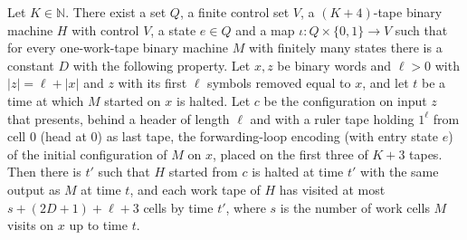 \begin{theorem}
\label{Complexity.f6_loop}
\leanok
{}
Let $K\in\mathbb{N}$. There exist a set $Q$, a finite control set $V$, a $(K+4)$-tape binary machine
$H$ with control $V$, a state $e\in Q$ and a map $\iota:Q\times\{0,1\}\to V$ such that for every
one-work-tape binary machine $M$ with finitely many states there is a constant $D$ with the
following property. Let $x,z$ be binary words and $\ell>0$ with $|z|=\ell+|x|$ and $z$ with its
first $\ell$ symbols removed equal to $x$, and let $t$ be a time at which $M$ started on $x$ is
halted. Let $c$ be the configuration on input $z$ that presents, behind a header of length $\ell$
and with a ruler tape holding $1^\ell$ from cell $0$ (head at $0$) as last tape, the forwarding-loop
encoding (with entry state $e$) of the initial configuration of $M$ on $x$, placed on the first
three of $K+3$ tapes. Then there is $t'$ such that $H$ started from $c$ is halted at time $t'$ with
the same output as $M$ at time $t$, and each work tape of $H$ has visited at most $s+(2D+1)+\ell+3$
cells by time $t'$, where $s$ is the number of work cells $M$ visits on $x$ up to time $t$.
\end{theorem}

